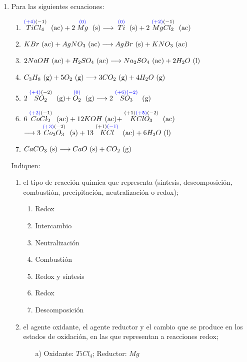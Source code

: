 \documentclass[../practica.root.tex]{subfiles}
\begin{document}
\begin{enumerate}
	\item Para las siguientes ecuaciones: \\
	      \begin{enumerate}
		      \item $\stackrel{\textcolor{blue}{(+4)}(-1)}{TiCl_4} \ \text{(ac)} + 2 \stackrel{\textcolor{blue}{(0)}}{Mg} \ \text{(s)} \longrightarrow{} \stackrel{\textcolor{blue}{(0)}}{Ti} \ \text{(s)} + 2 \stackrel{\textcolor{blue}{(+2)}(-1)}{MgCl_2} \ \text{(ac)}$
		      \item $KBr \ \text{(ac)} + AgNO_3 \ \text{(ac)} \longrightarrow{} AgBr \ \text{(s)} + KNO_3 \ \text{(ac)}$
		      \item $2 NaOH \ \text{(ac)} + H_2SO_4 \ \text{(ac)} \longrightarrow{} Na_2SO_4 \ \text{(ac)} + 2 H_2O \ \text{(l)}$
		      \item $C_3H_8 \ \text{(g)} + 5 O_2 \ \text{(g)} \longrightarrow{} 3 CO_2 \ \text{(g)} + 4 H_2O \ \text{(g)}$
		      \item $2 \stackrel{\textcolor{blue}{(+4)}(-2)}{SO_2} \ \text{(g)} + \stackrel{\textcolor{blue}{(0)}}{O_2} \ \text{(g)} \longrightarrow{} 2 \stackrel{\textcolor{blue}{(+6)(-2)}}{SO_3} \ \text{(g)}$
		      \item $6 \stackrel{\textcolor{blue}{(+2)}(-1)}{CoCl_2} \ \text{(ac)} + 12 KOH \ \text{(ac)} + \stackrel{(+1)\textcolor{blue}{(+5)}(-2)}{KClO_3} \ \text{(ac)}$
		            $\longrightarrow{} 3 \stackrel{\textcolor{blue}{(+3)}(-2)}{Co_2O_3} \ \text{(s)} + 13 \stackrel{(+1)\textcolor{blue}{(-1)}}{KCl} \ \text{(ac)} + 6 H_2O \ \text{(l)}$
		      \item $CaCO_3 \ \text{(s)} \longrightarrow{} CaO \ \text{(s)} + CO_2 \ \text{(g)}$
	      \end{enumerate}
	      Indiquen:
	      \begin{enumerate}
		      \item el tipo de reacción química que representa (síntesis, descomposición, combustión,
		            precipitación, neutralización o redox);
		            \begin{enumerate}[label=\alph*)]
			            \item Redox
			            \item Intercambio
			            \item Neutralización
			            \item Combustión
			            \item Redox y síntesis
			            \item Redox
			            \item Descomposición
		            \end{enumerate}
		      \item el agente oxidante, el agente reductor y el cambio que se produce en los estados de
		            oxidación, en las que representan a reacciones redox;
		            \begin{enumerate}
			            \item[a)] Oxidante: $TiCl_4$; Reductor: $Mg$

\end{enumerate}
\end{enumerate}
\end{enumerate}
\end{document}

